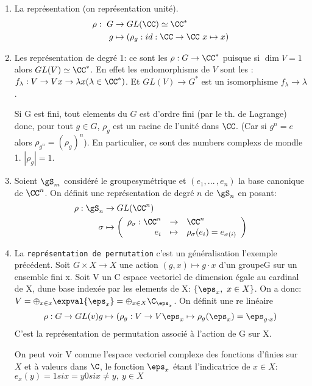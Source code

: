 \begin{examplebox}
	\begin{enumerate}
		\item La représentation  (on représentation unité).
		\begin{align*}
			\rho:\ G &\rightarrow GL(\CC)\simeq\CC^\ast\\
			g &\mapsto (\rho_g: id:\CC\rightarrow \CC\ x\mapsto x)
		\end{align*}
		\item Les représentation de degré 1: ce sont les  $\rho:G\rightarrow \CC^\ast$ puisque si $\dim V= 1$ alors $GL(V)\simeq\CC^\ast$.
		En effet les endomorphisms de $V$ sont les : $f_\lambda: V\rightarrow V x\rightarrow \lambda x(\lambda\in \CC^\ast)$. Et $GL(V)\rightarrow  G^\ast$ est un isomorphisme $f_\lambda\rightarrow \lambda$.
		
		Si G est fini, tout elements du $G$ est d'ordre fini (par le th. de Lagrange) donc, pour tout $g \in G$, $\rho_g$ est un racine de l'unité dans $\CC$.
		(Car si $g^n=e$ alors $\rho_{g^n}=(\rho_g)^n$). En particulier, ce sont des numbers complexs de mondle 1. $|\rho_g|=1$.
		\item Soient $\gS_m$ considéré le groupesymétrique et $(e_1,...\,, e_n)$ la base canonique de $\CC^n$. On définit une représentation de degré $n$ de $\gS_n$ en posant:
		\begin{align*}
			\rho:\gS_n &\rightarrow GL(\CC^n) \\
			\sigma &\mapsto \left(
				\begin{array}{rcl} \rho_\sigma: \CC^n &\rightarrow&  \CC^n \\ e_i &\mapsto& \rho_\sigma(e_i)=e_{\sigma(i)} \end{array}
			\right)
		\end{align*}
		\item La \texttt{représentation de permutation} c'est un généralisation l'exemple précédent. Soit $G\times X\rightarrow X$ une action $(g,x)\mapsto g\cdot x$ d'un groupeG sur un ensemble fini x. Soit V un C espace vectoriel de dimension égale au cardinal de X, dune base indexée par les elements de X: $\{\eps_x,\ x\in X\}$. On a donc: $V=\oplus_{x\in x}\expval{\eps_x}=\oplus_{x\in X}\C_{\eps_x}$. On définit une re linéaire
		$$ \rho: G\rightarrow  GL(v)\\g\mapsto(\rho_g:V\rightarrow  V\\\eps_x\mapsto \rho_g(\eps_x)=\eps_{g\cdot x})$$
		C'est la représentation de permutation associé à l'action de G sur X.
		\begin{remark}
			On peut voir V comme l'espace vectoriel complexe des fonctions d'finies sur $X$ et à valeurs dans $\C$, le fonction $\eps_x$ étant l'indicatrice de $x\in X$: $e_x(y)=1 si x=y 0 si x\neq y,\ y\in X$
		\end{remark}
		

\end{enumerate}
\end{examplebox}

